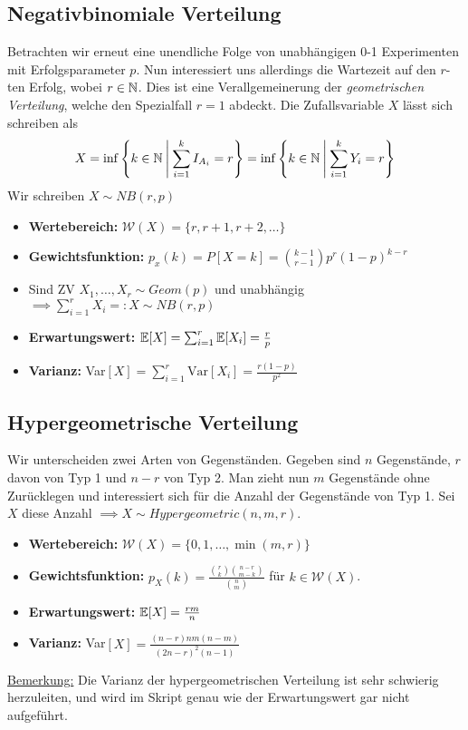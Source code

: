 \subsection{Negativbinomiale Verteilung}
Betrachten wir erneut eine unendliche Folge von unabhängigen 0-1 Experimenten mit Erfolgsparameter $p$. Nun interessiert uns allerdings die Wartezeit auf den $r$-ten Erfolg, wobei $r\in \mathbb{N}$. Dies ist eine Verallgemeinerung der \textit{geometrischen Verteilung}, welche den Spezialfall $r=1$ abdeckt. Die Zufallsvariable $X$ lässt sich schreiben als
$$ X = \inf \left\{k \in \mathbb{N} \: \middle| \: \sum_{i=1}^k I_{A_i} = r\right\} = \inf \left\{k \in \mathbb{N} \: \middle|\: \sum_{i=1}^k Y_i = r\right\}$$
Wir schreiben $X \sim NB(r,p)$
\begin{itemize}
\item \textbf{Wertebereich:} $\mathcal{W}(X) = \{r, r+1, r+2, \dots\}$
\item \textbf{Gewichtsfunktion:} $p_x(k) = P[X=k] = \binom{k-1}{r-1} p^r (1-p)^{k-r}$
\item Sind ZV $X_1,\dots,X_r \sim Geom(p)$ und unabhängig $\implies \sum_{i=1}^r X_i =: X \sim NB(r,p)$
\item \textbf{Erwartungswert:} $\mathbb{E}[X] = \sum_{i=1}^r \mathbb{E}[X_i] = \frac{r}{p}$
\item \textbf{Varianz:} Var$[X] = \sum_{i=1}^r \mbox{Var}[X_i] = \frac{r(1-p)}{p^2}$
\end{itemize}

\subsection{Hypergeometrische Verteilung}
Wir unterscheiden zwei Arten von Gegenständen. Gegeben sind $n$ Gegenstände, $r$ davon von Typ 1 und $n-r$ von Typ 2. Man zieht nun $m$ Gegenstände ohne Zurücklegen und interessiert sich für die Anzahl der Gegenstände von Typ 1. Sei $X$ diese Anzahl $\implies X \sim Hypergeometric(n,m,r)$.
\begin{itemize}
\item \textbf{Wertebereich:} $\mathcal{W}(X) = \{0,1, \dots, \min(m,r)\}$
\item \textbf{Gewichtsfunktion:} $p_X(k) = \frac{\binom{r}{k} \binom{n-r}{m-k}}{\binom{n}{m}}$ für $k\in \mathcal{W}(X)$.
\item \textbf{Erwartungswert:} $\mathbb{E}[X] = \frac{rm}{n}$
\item \textbf{Varianz:} Var$[X] = \frac{(n-r) n m (n-m)}{(2n-r)^2(n-1)}$
\end{itemize}
\underline{Bemerkung:} Die Varianz der hypergeometrischen Verteilung ist sehr schwierig herzuleiten, und wird im Skript genau wie der Erwartungswert gar nicht aufgeführt.

